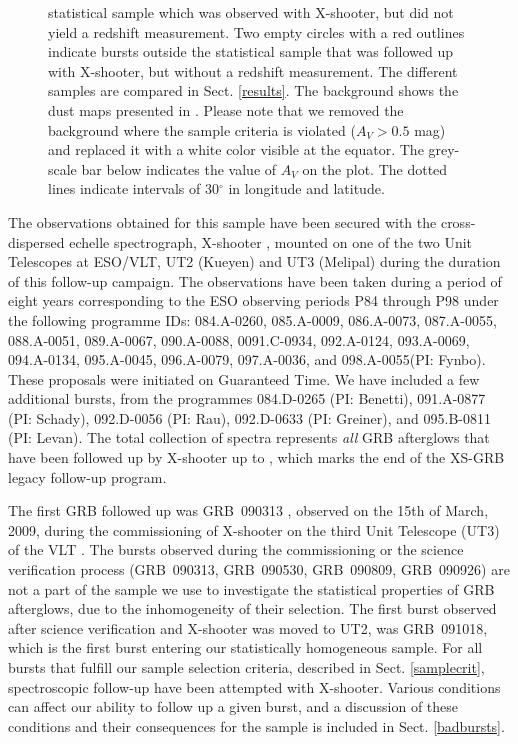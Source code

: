 \documentclass{aa}    %
\begin{document}
\begin{figure}
{	statistical sample which was observed with X-shooter, but did not yield a
	redshift measurement. Two empty circles with a red outlines indicate bursts
	outside the statistical sample that was followed up with X-shooter, but without
	a redshift measurement. The different samples are compared in Sect.
	\ref{results}. The background shows the dust maps presented in
	\citet{Schlegel1998}. Please note that we removed the background where the
	sample criteria is violated ($A_V > 0.5$ mag) and replaced it with a white
	color visible at the equator. The grey-scale bar below indicates the value of
	$A_V$ on the plot. The dotted lines indicate intervals of 30$^\circ$ in
	longitude and latitude.} \label{fig:skymap}
\end{figure}



The observations obtained for this sample have been secured with the
cross-dispersed echelle spectrograph, X-shooter \citep{Vernet2011}, mounted on
one of the two Unit Telescopes at ESO/VLT, UT2 (Kueyen) and UT3 (Melipal) during
the duration of this follow-up campaign. The observations have been taken during
a period of eight years corresponding to the ESO observing periods P84 through P98
under the following programme IDs: 084.A-0260, 085.A-0009, 086.A-0073,
087.A-0055, 088.A-0051, 089.A-0067, 090.A-0088, 0091.C-0934, 092.A-0124,
093.A-0069, 094.A-0134, 095.A-0045, 096.A-0079, 097.A-0036, and 098.A-0055(PI:
Fynbo). These proposals were initiated on Guaranteed Time. We have included a
few additional bursts, from the programmes 084.D-0265 (PI: Benetti), 091.A-0877
(PI: Schady), 092.D-0056 (PI: Rau), 092.D-0633 (PI: Greiner), and 095.B-0811
(PI: Levan). The total collection of spectra represents \textit{all} GRB
afterglows that have been followed up by X-shooter up to \termdate, which marks
the end of the XS-GRB legacy follow-up program.

The first GRB followed up was GRB~090313 \citep{DeUgartePostigo2010}, observed
on the 15th of March, 2009, during the commissioning of X-shooter on the third
Unit Telescope (UT3) of the VLT . The bursts observed during the commissioning
or the science verification process (GRB~090313, GRB~090530, GRB~090809,
GRB~090926) are not a part of the sample we use to investigate the statistical
properties of GRB afterglows, due to the inhomogeneity of their selection. The
first burst observed after science verification and X-shooter was moved to UT2,
was GRB~091018, which is the first burst entering our statistically homogeneous
sample. For all bursts that fulfill our sample selection criteria, described in
Sect. \ref{samplecrit}, spectroscopic follow-up have been attempted with
X-shooter. Various conditions can affect our ability to follow up a given burst,
and a discussion of these conditions and their consequences for the sample is
included in Sect. \ref{badbursts}.
\end{document}
